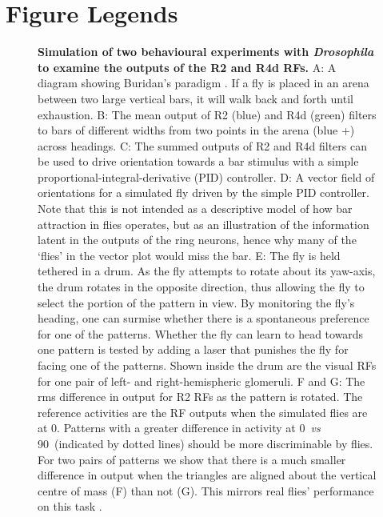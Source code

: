 \section*{Figure Legends}
%
\begin{figure}[htp]
	\caption{
		{\bf Simulation of two behavioural experiments with \emph{Drosophila} to examine the outputs of the R2 and R4d RFs.}
		A: A diagram showing Buridan's paradigm \protect\cite{Gotz1980,Bulthoff1982}. If a fly is placed in an arena between two large vertical bars, it will walk back and forth until exhaustion.
		B: The mean output of R2 (blue) and R4d (green) filters to bars of different widths from two points in the arena (blue +) across headings.
		C: The summed outputs of R2 and R4d filters can be used to drive orientation towards a bar stimulus with a simple
		proportional-integral-derivative (PID) controller.
		D: A vector field of orientations for a simulated fly driven by the simple PID controller.
		Note that this is not intended as a descriptive model of how bar attraction in flies operates, but as an illustration of the information latent in the outputs of the ring neurons, hence why many of the `flies' in the vector plot would miss the bar.
		E: The fly is held tethered in a drum. As the fly attempts to rotate about its yaw-axis, the drum rotates in the opposite direction, thus allowing the fly to select the portion of the pattern in view.
		By monitoring the fly's heading, one can surmise whether there is a spontaneous preference for one of the patterns.
		Whether the fly can learn to head towards one pattern is tested by adding a laser that punishes the fly for facing one of the patterns.
		Shown inside the drum are the visual \acp{RF} for one pair of left- and right-hemispheric glomeruli.
		F and G: The \ac{rms} difference in output for R2 RFs as the pattern is rotated.
		The reference activities are the \ac{RF} outputs when the simulated flies are at 0\degree.
		Patterns with a greater difference in activity at 0\degree\ \emph{vs} 90\degree\ (indicated by dotted lines) should be more discriminable by flies.
		For two pairs of patterns we show that there is a much smaller difference in output when the triangles are aligned about the vertical centre of mass (F) than not (G).
		This mirrors real flies' performance on this task \cite{Ernst1999}.
	}
	\label{fig:recap}
\end{figure}

